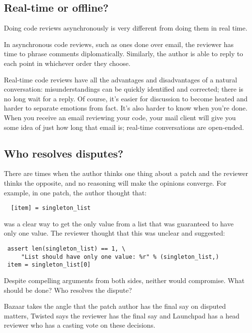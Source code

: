 \documentclass{article}
\begin{document}
\subsection{Real-time or offline?}

Doing code reviews asynchronously is very different from doing them in real time.

In asynchronous code reviews, such as ones done over email, the reviewer has time to phrase comments diplomatically. Similarly, the author is able to reply to each point in whichever order they choose.

Real-time code reviews have all the advantages and disadvantages of a natural conversation: misunderstandings can be quickly identified and corrected; there is no long wait for a reply. Of course, it's easier for discussion to become heated and harder to separate emotions from fact. It's also harder to know when you're done. When you receive an email reviewing your code, your mail client will give you some idea of just how long that email is; real-time conversations are open-ended.

\subsection{Who resolves disputes?}

There are times when the author thinks one thing about a patch and the reviewer thinks the opposite, and no reasoning will make the opinions converge. For example, in one patch, the author thought that:

\begin{verbatim}
  [item] = singleton_list
\end{verbatim}

was a clear way to get the only value from a list that was guaranteed to have only one value. The reviewer thought that this was unclear and suggested:

\begin{verbatim}
 assert len(singleton_list) == 1, \
     "List should have only one value: %r" % (singleton_list,)
 item = singleton_list[0]
\end{verbatim}

Despite compelling arguments from both sides, neither would compromise. What should be done? Who resolves the dispute?

Bazaar takes the angle that the patch author has the final say on disputed matters, Twisted says the reviewer has the final say and Launchpad has a head reviewer who has a casting vote on these decisions.
\end{document}
